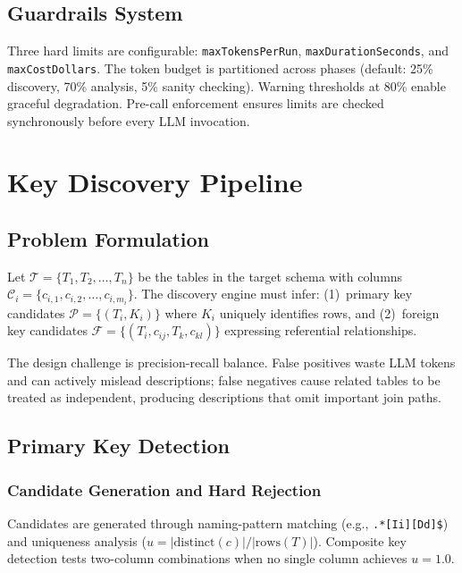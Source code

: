 \documentclass[twocolumn]{svjour3}
\begin{document}
\subsection{Guardrails System}

Three hard limits are configurable: \texttt{maxTokensPerRun}, \texttt{maxDurationSeconds}, and \texttt{maxCostDollars}. The token budget is partitioned across phases (default: 25\% discovery, 70\% analysis, 5\% sanity checking). Warning thresholds at 80\% enable graceful degradation. Pre-call enforcement ensures limits are checked synchronously before every LLM invocation.


\section{Key Discovery Pipeline}\label{sec:keydiscovery}

\subsection{Problem Formulation}

Let $\mathcal{T} = \{T_1, T_2, \ldots, T_n\}$ be the tables in the target schema with columns $\mathcal{C}_i = \{c_{i,1}, c_{i,2}, \ldots, c_{i,m_i}\}$. The discovery engine must infer: (1)~primary key candidates $\mathcal{P} = \{(T_i, K_i)\}$ where $K_i$ uniquely identifies rows, and (2)~foreign key candidates $\mathcal{F} = \{(T_i, c_{ij}, T_k, c_{kl})\}$ expressing referential relationships.

The design challenge is precision-recall balance. False positives waste LLM tokens and can actively mislead descriptions; false negatives cause related tables to be treated as independent, producing descriptions that omit important join paths.

\subsection{Primary Key Detection}

\subsubsection{Candidate Generation and Hard Rejection}

Candidates are generated through naming-pattern matching (e.g., \texttt{.*[Ii][Dd]\$}) and uniqueness analysis ($u = |\mathrm{distinct}(c)| / |\mathrm{rows}(T)|$). Composite key detection tests two-column combinations when no single column achieves $u = 1.0$.
\end{document}
